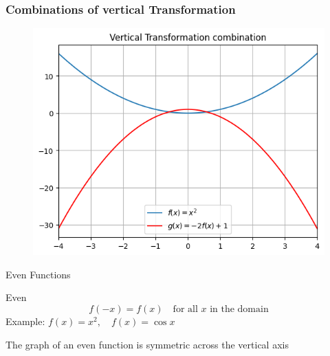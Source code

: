\documentclass{beamer}
\begin{document}
\begin{frame}
  \frametitle{Combinations of vertical Transformation}
  \begin{figure}[h]    
    \centering
    \includegraphics[scale=0.55]{vertical_combination.png}
    \end{figure}
\end{frame}
\begin{frame}{Even Functions}  
\begin{block}{Even}
        \[
        f(-x) = f(x) \quad \text{for all } x \text{ in the domain}
        \]
        Example: \( f(x) = x^2, \quad f(x) = \cos x \)
\end{block}
The graph of an even function is symmetric across the vertical axis 
\end{frame}
\end{document}
